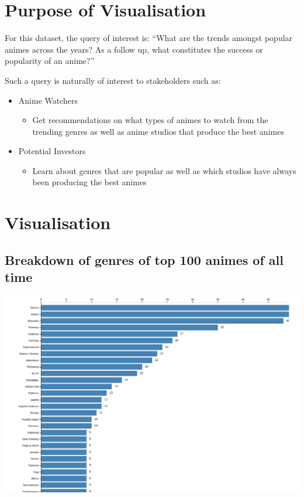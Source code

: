 \documentclass[a4paper, 11pt]{article}
\begin{document}
\section{Purpose of Visualisation}
\label{sec:org83f4fc5}
For this dataset, the query of interest is: ``What are the trends amongst popular animes across the years? As a follow up, what constitutes the success or popularity of an anime?''

Such a query is naturally of interest to stakeholders such as:
\begin{itemize}
\item Anime Watchers
\begin{itemize}
\item Get recommendations on what types of animes to watch from the trending genres as well as anime studios that produce the best animes
\end{itemize}
\item Potential Investors
\begin{itemize}
\item Learn about genres that are popular as well as which studios have always been producing the best animes
\end{itemize}
\end{itemize}
\section{Visualisation}
\label{sec:orgf6a8234}
\subsection{Breakdown of genres of top 100 animes of all time}
\label{sec:orgd186c51}

\begin{center}
\includegraphics[width=.9\linewidth]{./charts/anime_genre_across_time.png}
\end{center}
\end{document}
